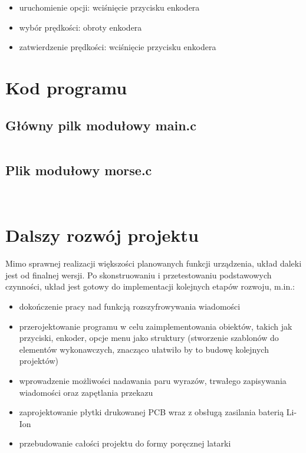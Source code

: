 \documentclass{article}
\begin{document}
\begin{itemize}
	\begin{itemize}
	\item uruchomienie opcji: wciśnięcie przycisku enkodera
	\item wybór prędkości: obroty enkodera
	\item zatwierdzenie prędkości: wciśnięcie przycisku enkodera
	\end{itemize}

\end{itemize}

\section{Kod programu}

\subsection{Główny pilk modułowy main.c}
\begin{multicols}{2}
\lstset{tabsize=1}
\begin{lstlisting}

\end{lstlisting}
\end{multicols}

\subsection{Plik modułowy morse.c}

\begin{multicols}{2}
\lstset{tabsize=1}
\begin{lstlisting}


\end{lstlisting}
\end{multicols}

\section{Dalszy rozwój projektu}
Mimo sprawnej realizacji większości planowanych funkcji urządzenia, układ daleki jest od finalnej wersji. Po skonstruowaniu i przetestowaniu podstawowych czynności, układ jest gotowy do implementacji kolejnych etapów rozwoju, m.in.:
	\begin{itemize}
	\item dokończenie pracy nad funkcją rozszyfrowywania wiadomości
	
	\item przerojektowanie programu w celu zaimplementowania obiektów, takich jak przyciski, enkoder, opcje menu jako struktury (stworzenie szablonów do elementów wykonawczych, znacząco ułatwiło by to budowę kolejnych projektów)
	
	\item wprowadzenie możliwości nadawania paru wyrazów, trwałego zapisywania wiadomości oraz zapętlania przekazu	
	
	\item zaprojektowanie płytki drukowanej PCB wraz z obsługą zasilania baterią Li-Ion
	
	\item przebudowanie całości projektu do formy poręcznej latarki
	\end{itemize}
\end{document}
